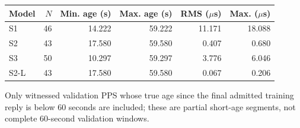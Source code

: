 \begin{center}\small
\begin{tabular}{lrrrrr}\toprule
Model & $N$ & Min. age (s) & Max. age (s) & RMS ($\mu$s) & Max. ($\mu$s) \\ \midrule
S1 & 46 & 14.222 & 59.222 & 11.171 & 18.088 \\
S2 & 43 & 17.580 & 59.580 & 0.407 & 0.680 \\
S3 & 50 & 10.297 & 59.297 & 3.776 & 6.046 \\
S2-L & 43 & 17.580 & 59.580 & 0.067 & 0.206 \\
\bottomrule\end{tabular}\end{center}
{\small Only witnessed validation PPS whose true age since the final admitted training reply is below 60 seconds are included; these are partial short-age segments, not complete 60-second validation windows.}
